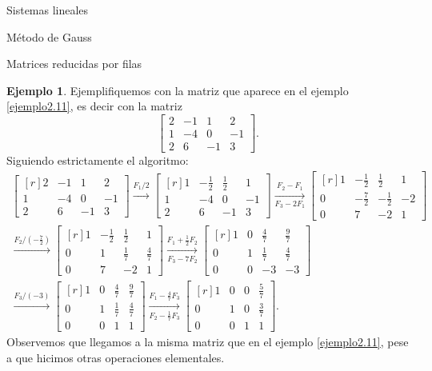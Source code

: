 \documentclass[a4paper,12pt,twoside,spanish]{amsbook}
\theoremstyle{definition}
\newtheorem{ejemplo}{Ejemplo}[section]
\theoremstyle{remark}
\begin{document}
\begin{chapter}{Sistemas lineales}
\begin{section}{Método de Gauss }
\begin{subsection}{Matrices reducidas por filas}
				
				\begin{ejemplo} Ejemplifiquemos con la matriz que aparece en el ejemplo  \ref{ejemplo2.11},  es decir con la matriz
					$$
					\begin{bmatrix} 2& -1&1& 2 \\ 1&-4 &0&-1 \\ 2&6&-1&3 \end{bmatrix}.
					$$
					Siguiendo estrictamente el algoritmo:
					\begin{multline*}
					\begin{bmatrix*}[r] 2& -1&1& 2 \\ 1&-4 &0&-1 \\ 2&6&-1&3 \end{bmatrix*}
					\stackrel{F_1/2}{\longrightarrow} 
					\begin{bmatrix*}[r] 1& -\frac12&\frac12& 1 \\ 1&-4 &0&-1 \\ 2&6&-1&3 \end{bmatrix*}
					\underset{F_3-2F_1}{\stackrel{F_2- F_1}{\longrightarrow}} 
					\begin{bmatrix*}[r] 1& -\frac12&\frac12& 1 \\ 0&-\frac72 &-\frac12&-2 \\ 0&7&-2&1 \end{bmatrix*}
					\\
					\stackrel{F_2/(-\frac72)}{\longrightarrow} 
					\begin{bmatrix*}[r] 1& -\frac12&\frac12& 1 \\ 0&1 &\frac17&\frac47 \\ 0&7&-2&1 \end{bmatrix*}
					\underset{F_3-7F_2}{\stackrel{F_1 +\frac12 F_2}{\longrightarrow}} 
					\begin{bmatrix*}[r] 1& 0&\frac47& \frac97 \\ 0&1 &\frac17&\frac47 \\ 0&0&-3&-3 \end{bmatrix*}
					\\
					\stackrel{F_3/(-3)}{\longrightarrow} 
					\begin{bmatrix*}[r] 1& 0&\frac47& \frac97 \\ 0&1 &\frac17&\frac47 \\ 0&0&1&1 \end{bmatrix*}
					\underset{F_2-\frac17F_3}{\stackrel{F_1 -\frac47 F_3}{\longrightarrow}} 
					\begin{bmatrix*}[r] 1& 0&0& \frac{5}7 \\ 0&1 &0&\frac37 \\ 0&0&1&1 \end{bmatrix*}.
					\end{multline*}
					Observemos que llegamos a la misma matriz que en el ejemplo \ref{ejemplo2.11}, pese a que hicimos otras operaciones elementales.
				\end{ejemplo}
				


\end{subsection}
\end{section}
\end{chapter}
\end{document}
